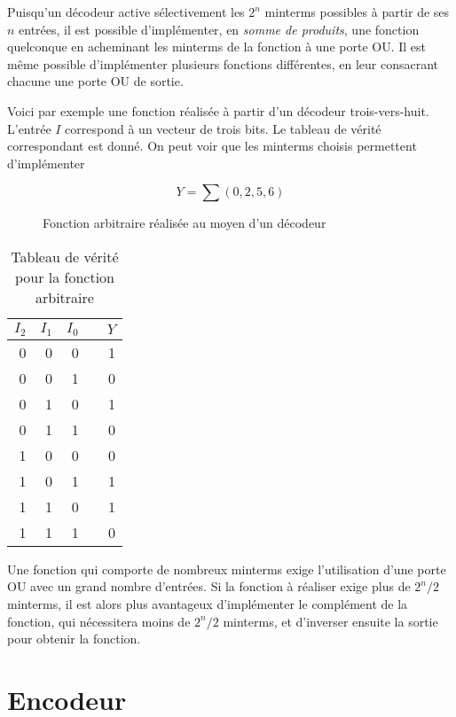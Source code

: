 \documentclass[letter, oneside]{book}
\begin{document}
\begin{enumerate}
Puisqu'un décodeur active sélectivement les \(2^n\) minterms possibles
à partir de ses \(n\) entrées, il est possible d'implémenter, en \emph{somme
de produits}, une fonction quelconque en acheminant les minterms de la
fonction à une porte OU. Il est même possible d'implémenter plusieurs
fonctions différentes, en leur consacrant chacune une porte OU de
sortie.

Voici par exemple une fonction réalisée à partir d'un décodeur
trois-vers-huit. L'entrée \(I\) correspond à un vecteur de trois bits. Le
tableau de vérité correspondant est donné. On peut voir que les
minterms choisis permettent d'implémenter

$$Y = \sum(0,2,5,6)$$

\begin{figure}[htbp]
\centering

\caption{\label{fig:orgd919515}Fonction arbitraire réalisée au moyen d'un décodeur}
\end{figure}


\begin{table}[htbp]
\caption{\label{tab:org1670b91}Tableau de vérité pour la fonction arbitraire}
\centering
\begin{tabular}{rrrlr}
\(I_2\) & \(I_1\) & \(I_0\) &  & \(Y\)\\[0pt]
\hline
0 & 0 & 0 &  & 1\\[0pt]
0 & 0 & 1 &  & 0\\[0pt]
0 & 1 & 0 &  & 1\\[0pt]
0 & 1 & 1 &  & 0\\[0pt]
1 & 0 & 0 &  & 0\\[0pt]
1 & 0 & 1 &  & 1\\[0pt]
1 & 1 & 0 &  & 1\\[0pt]
1 & 1 & 1 &  & 0\\[0pt]
\end{tabular}
\end{table}

Une fonction qui comporte de nombreux minterms exige l'utilisation
d'une porte OU avec un grand nombre d'entrées. Si la fonction à
réaliser exige plus de \(2^n/2\) minterms, il est alors plus
avantageux d'implémenter le complément de la fonction, qui nécessitera
moins de \(2^n/2\) minterms, et d'inverser ensuite la sortie pour
obtenir la fonction.
\end{enumerate}

\section{Encodeur}
\label{sec:orgebe07a7}
\end{document}
